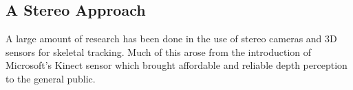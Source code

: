 \subsection{A Stereo Approach}

A large amount of research has been done in the use of stereo cameras and 3D sensors for skeletal tracking. Much of this arose from the introduction of Microsoft's Kinect\cite{kinect} sensor which brought affordable and reliable depth perception to the general public.





